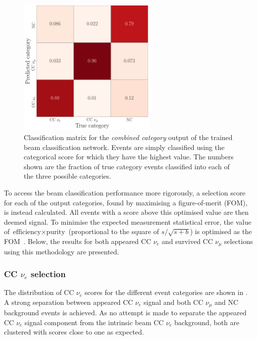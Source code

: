 \begin{figure} %
    \includegraphics[width=0.6\textwidth]{diagrams/7-results/final_comb_cat_confusion.pdf}
    \caption[Classification matrix for the combined category output of the beam classification
        network] {Classification matrix for the \emph{combined category} output of the trained
        beam classification network. Events are simply classified using the categorical score for
        which they have the highest value. The numbers shown are the fraction of true category
        events classified into each of the three possible categories.}
    \label{fig:final_comb_cat_confusion}
\end{figure}

To access the beam classification performance more rigorously, a selection score for each of the
output categories, found by maximising a figure-of-merit (FOM), is instead calculated. All events
with a score above this optimised value are then deemed signal. To minimise the expected
measurement statistical error, the value of $\text{efficiency}\times\text{purity}$ (proportional
to the square of $s/\sqrt{s+b}$) is optimised as the FOM~\cite{list2002}. Below, the results for
both appeared CC $\nu_{e}$ and survived CC $\nu_{\mu}$ selections using this methodology are
presented.

\subsubsection*{CC $\nu_{e}$ selection} %

The distribution of CC $\nu_{e}$ scores for the different event categories are shown in
. A strong separation between appeared CC $\nu_{e}$ signal
and both CC $\nu_{\mu}$ and NC background events is achieved. As no attempt is made to separate
the appeared CC $\nu_{e}$ signal component from the intrinsic beam CC $\nu_{e}$ background, both
are clustered with scores close to one as expected.

